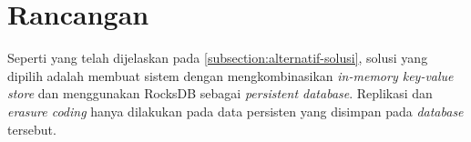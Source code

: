 \section{Rancangan}

Seperti yang telah dijelaskan pada \ref{subsection:alternatif-solusi}, solusi yang dipilih adalah membuat sistem dengan mengkombinasikan \textit{in-memory key-value store} dan menggunakan RocksDB sebagai \textit{persistent database}. Replikasi dan \textit{erasure coding} hanya dilakukan pada data persisten yang disimpan pada \textit{database} tersebut.





